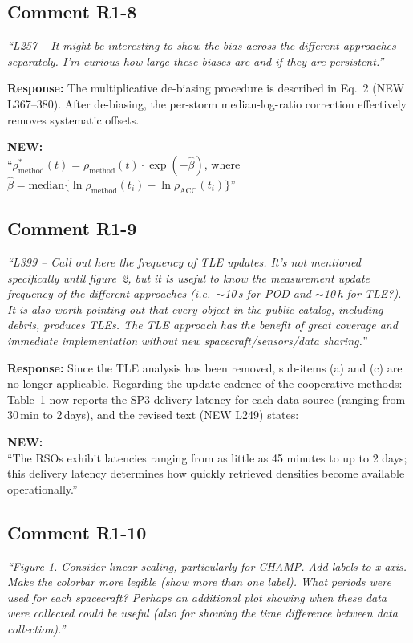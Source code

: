 \documentclass[11pt]{article}
\newcommand{\reviewercomment}[1]{%
  \medskip
  \noindent\textit{\color{reviewblue}#1}%
  \medskip
}
\newcommand{\newtext}[1]{%
  \smallskip
  \noindent\hspace{1em}\begin{minipage}{0.92\textwidth}%
  \color{quotegreen}\textbf{NEW:}\\[2pt]``#1''%
  \end{minipage}%
  \smallskip
}
\begin{document}
\subsection{Comment R1-8}

\reviewercomment{%
``L257 -- It might be interesting to show the bias across the different approaches separately. I'm curious how large these biases are and if they are persistent.''}

\textbf{Response:}
The multiplicative de-biasing procedure is described in Eq.~2 (NEW L367--380). After de-biasing, the per-storm median-log-ratio correction effectively removes systematic offsets.
\newtext{$\rho^*_\mathrm{method}(t) = \rho_\mathrm{method}(t) \cdot \exp(-\hat{\beta})$, where $\hat{\beta} = \mathrm{median}\{ \ln \rho_\mathrm{method}(t_i) - \ln \rho_\mathrm{ACC}(t_i) \}$}


\subsection{Comment R1-9}

\reviewercomment{%
``L399 -- Call out here the frequency of TLE updates. It's not mentioned specifically until figure~2, but it is useful to know the measurement update frequency of the different approaches (i.e.\ $\sim$10\,s for POD and $\sim$10\,h for TLE?). It is also worth pointing out that every object in the public catalog, including debris, produces TLEs. The TLE approach has the benefit of great coverage and immediate implementation without new spacecraft/sensors/data sharing.''}

\textbf{Response:}
Since the TLE analysis has been removed, sub-items (a) and (c) are no longer applicable. Regarding the update cadence of the cooperative methods: Table~1 now reports the SP3 delivery latency for each data source (ranging from 30\,min to 2\,days), and the revised text (NEW L249) states:

\newtext{The RSOs exhibit latencies ranging from as little as 45 minutes to up to 2 days; this delivery latency determines how quickly retrieved densities become available operationally.}


\subsection{Comment R1-10}

\reviewercomment{%
``Figure 1. Consider linear scaling, particularly for CHAMP. Add labels to x-axis. Make the colorbar more legible (show more than one label). What periods were used for each spacecraft? Perhaps an additional plot showing when these data were collected could be useful (also for showing the time difference between data collection).''}
\end{document}
